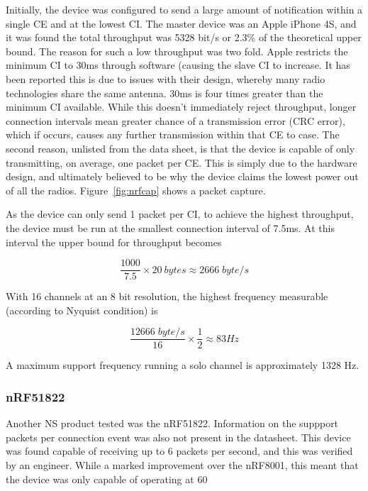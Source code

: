 \documentclass[]{article}
\begin{document}
Initially, the device was configured to send a large amount of notification within a single \ac{CE} and at the lowest \ac{CI}. The master device was an Apple iPhone 4S, and it was found the total throughput was 5328 bit/s or 2.3\% of the theoretical upper bound. The reason for such a low throughput was two fold. Apple restricts the minimum \ac{CI} to 30ms through software (causing the slave \ac{CI} to increase. It has been reported this is due to issues with their design, whereby many radio technologies share the same antenna. 30ms is four times greater than the minimum \ac{CI} available. While this doesn't immediately reject throughput, longer connection intervals mean greater chance of a transmission error (CRC error), which if occurs, causes any further transmission within that \ac{CE} to case. The second reason, unlisted from the data sheet\cite{nrf8001}, is that the device is capable of only transmitting, on average, one packet per \ac{CE}. This is simply due to the hardware design, and ultimately believed to be why the device claims the lowest power out of all the radios. Figure~\ref{fig:nrfcap} shows a packet capture.


As the device can only send 1 packet per \ac{CI}, to achieve the highest throughput, the device must be run at the smallest connection interval of 7.5ms. At this interval the upper bound for throughput becomes

\begin{displaymath}
\frac{1000}{7.5} \times 20\:bytes \approx 2666\;byte/s
\end{displaymath}

With 16 channels at an 8 bit resolution, the highest frequency measurable (according to Nyquist condition) is 

\begin{displaymath}
\frac{1 2666\; byte/s}{16} \times \frac{1}{2} \approx 83  Hz
\end{displaymath}

A maximum support frequency running a solo channel is approximately 1328 Hz.

\subsubsection{nRF51822}
Another \ac{NS} product tested was the nRF51822. Information on the suppport packets per connection event was also not present in the datasheet\cite{nrf51822}. This device was found capable of receiving up to 6 packets per second, and this was verified by an engineer\cite{olme}. While a marked improvement over the nRF8001, this meant that the device was only capable of operating at 60%
\end{document}
